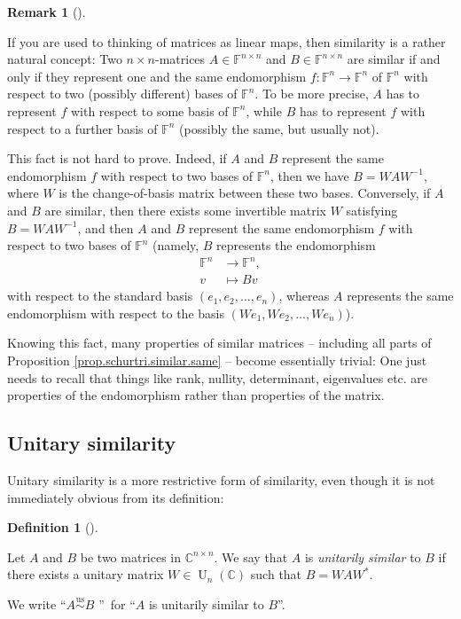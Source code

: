 \documentclass[numbers=enddot,12pt,final,onecolumn,notitlepage]{scrartcl}%
\numberwithin{exer}{subsection}
\theoremstyle{definition}
\newtheorem{defi}[theo]{Definition}
\newenvironment{definition}[1][]
{\begin{defi}[#1]\begin{leftbar}}
{\end{leftbar}\end{defi}}
\newtheorem{remk}[theo]{Remark}
\newenvironment{remark}[1][]
{\begin{remk}[#1]\begin{leftbar}}
{\end{leftbar}\end{remk}}
\begin{document}
\begin{remark}
If you are used to thinking of matrices as linear maps, then similarity is a
rather natural concept: Two $n\times n$-matrices $A\in\mathbb{F}^{n\times n}$
and $B\in\mathbb{F}^{n\times n}$ are similar if and only if they represent one
and the same endomorphism $f:\mathbb{F}^{n}\rightarrow\mathbb{F}^{n}$ of
$\mathbb{F}^{n}$ with respect to two (possibly different) bases of
$\mathbb{F}^{n}$. To be more precise, $A$ has to represent $f$ with respect to
some basis of $\mathbb{F}^{n}$, while $B$ has to represent $f$ with respect to
a further basis of $\mathbb{F}^{n}$ (possibly the same, but usually not).

This fact is not hard to prove. Indeed, if $A$ and $B$ represent the same
endomorphism $f$ with respect to two bases of $\mathbb{F}^{n}$, then we have
$B=WAW^{-1}$, where $W$ is the change-of-basis matrix between these two bases.
Conversely, if $A$ and $B$ are similar, then there exists some invertible
matrix $W$ satisfying $B=WAW^{-1}$, and then $A$ and $B$ represent the same
endomorphism $f$ with respect to two bases of $\mathbb{F}^{n}$ (namely, $B$
represents the endomorphism%
\begin{align*}
\mathbb{F}^{n}  &  \rightarrow\mathbb{F}^{n},\\
v  &  \mapsto Bv
\end{align*}
with respect to the standard basis $\left(  e_{1},e_{2},\ldots,e_{n}\right)
$, whereas $A$ represents the same endomorphism with respect to the basis
$\left(  We_{1},We_{2},\ldots,We_{n}\right)  $).

Knowing this fact, many properties of similar matrices -- including all parts
of Proposition \ref{prop.schurtri.similar.same} -- become essentially trivial:
One just needs to recall that things like rank, nullity, determinant,
eigenvalues etc. are properties of the endomorphism rather than properties of
the matrix.
\end{remark}

\subsection{Unitary similarity}

Unitary similarity is a more restrictive form of similarity, even though it is
not immediately obvious from its definition:

\begin{definition}
\label{def.schurtri.unisim.def}Let $A$ and $B$ be two matrices in
$\mathbb{C}^{n\times n}$. We say that $A$ is \emph{unitarily similar} to $B$
if there exists a unitary matrix $W\in\operatorname*{U}\nolimits_{n}\left(
\mathbb{C}\right)  $ such that $B=WAW^{\ast}$.

We write \textquotedblleft$A\overset{\operatorname*{us}}{\sim}B$%
\textquotedblright\ for \textquotedblleft$A$ is unitarily similar to
$B$\textquotedblright.
\end{definition}
\end{document}
